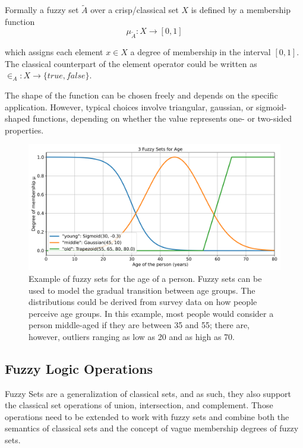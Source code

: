 Formally a fuzzy set $\tilde{A}$ over a crisp/classical set $X$ is defined by a membership function
\begin{equation}
      \mu_{\tilde{A}}: X \rightarrow [0, 1]
\end{equation}

which assigns each element $x \in X$ a degree of membership in the interval $[0, 1]$. The classical counterpart of the element operator could be written as $\in_A: X \rightarrow \{true, false\}$.

The shape of the function can be chosen freely and depends on the specific application. However, typical choices involve triangular, gaussian, or sigmoid-shaped functions, depending on whether the value represents one- or two-sided properties.


\begin{figure}[H]
      \centering
      \includegraphics[width=0.8\columnwidth,trim={0 0 0 1cm},clip]{figures/Intro/age-fuzzy-sets.png}
      \caption{Example of fuzzy sets for the age of a person. Fuzzy sets can be used to model the gradual transition between age groups. The distributions could be derived from survey data on how people perceive age groups. In this example, most people would consider a person middle-aged if they are between 35 and 55; there are, however, outliers ranging as low as 20 and as high as 70.}
      \label{fig:fuzzy_sets}
\end{figure}

\subsection{Fuzzy Logic Operations}

Fuzzy Sets are a generalization of classical sets, and as such, they also support the classical set operations of union, intersection, and complement. Those operations need to be extended to work with fuzzy sets and combine both the semantics of classical sets and the concept of vague membership degrees of fuzzy sets.

